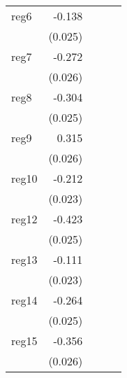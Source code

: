 {\begin{longtable}{l*{4}{D{.}{.}{-1}}}
\addlinespace
reg6        &      -0.138\sym{***}&                     &                     &                     \\
            &     (0.025)         &                     &                     &                     \\
\addlinespace
reg7        &      -0.272\sym{***}&                     &                     &                     \\
            &     (0.026)         &                     &                     &                     \\
\addlinespace
reg8        &      -0.304\sym{***}&                     &                     &                     \\
            &     (0.025)         &                     &                     &                     \\
\addlinespace
reg9        &       0.315\sym{***}&                     &                     &                     \\
            &     (0.026)         &                     &                     &                     \\
\addlinespace
reg10       &      -0.212\sym{***}&                     &                     &                     \\
            &     (0.023)         &                     &                     &                     \\
\addlinespace
reg12       &      -0.423\sym{***}&                     &                     &                     \\
            &     (0.025)         &                     &                     &                     \\
\addlinespace
reg13       &      -0.111\sym{***}&                     &                     &                     \\
            &     (0.023)         &                     &                     &                     \\
\addlinespace
reg14       &      -0.264\sym{***}&                     &                     &                     \\
            &     (0.025)         &                     &                     &                     \\
\addlinespace
reg15       &      -0.356\sym{***}&                     &                     &                     \\
            &     (0.026)         &                     &                     &                     \\

\end{longtable}}
